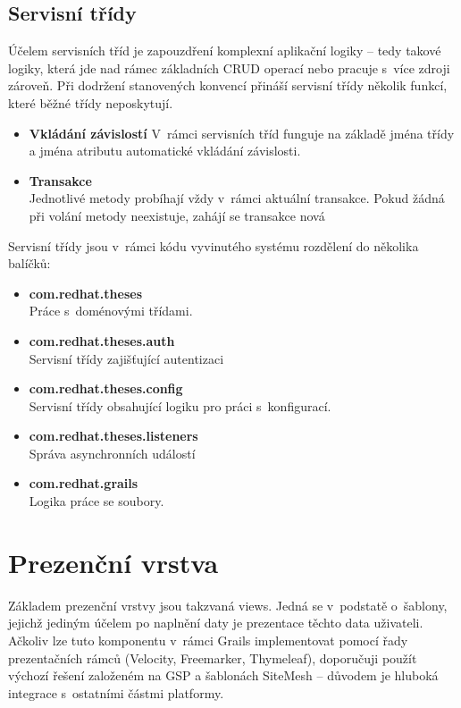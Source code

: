 \subsection{Servisní třídy}
Účelem servisních tříd je zapouzdření komplexní aplikační logiky -- tedy takové logiky, která jde nad rámec základních CRUD operací nebo pracuje s~více zdroji zároveň. Při dodržení stanovených konvencí přináší servisní třídy několik funkcí, které běžné třídy neposkytují.

\begin{itemize}
\item \textbf{Vkládání závislostí}
V~rámci servisních tříd funguje na základě jména třídy a jména atributu automatické vkládání závislosti.
\item \textbf{Transakce}\\
Jednotlivé metody probíhají vždy v~rámci aktuální transakce. Pokud žádná při volání metody neexistuje, zahájí se transakce nová
\end{itemize}

Servisní třídy jsou v~rámci kódu vyvinutého systému rozdělení do několika balíčků:
\begin{itemize}
\item \textbf{com.redhat.theses} \\
Práce s~doménovými třídami.
\item \textbf{com.redhat.theses.auth} \\
Servisní třídy zajišťující autentizaci
\item \textbf{com.redhat.theses.config} \\
Servisní třídy obsahující logiku pro práci s~konfigurací.
\item \textbf{com.redhat.theses.listeners} \\
Správa asynchronních událostí
\item \textbf{com.redhat.grails} \\
Logika práce se soubory.
\end{itemize}

\section{Prezenční vrstva}
Základem prezenční vrstvy jsou takzvaná views. Jedná se v~podstatě o~šablony, jejichž jediným účelem po naplnění daty je prezentace těchto data uživateli. Ačkoliv lze tuto komponentu v~rámci Grails implementovat pomocí řady prezentačních rámců (Velocity, Freemarker,  Thymeleaf), doporučuji použít výchozí řešení založeném na GSP a šablonách SiteMesh -- důvodem je hluboká integrace s~ostatními částmi platformy.

